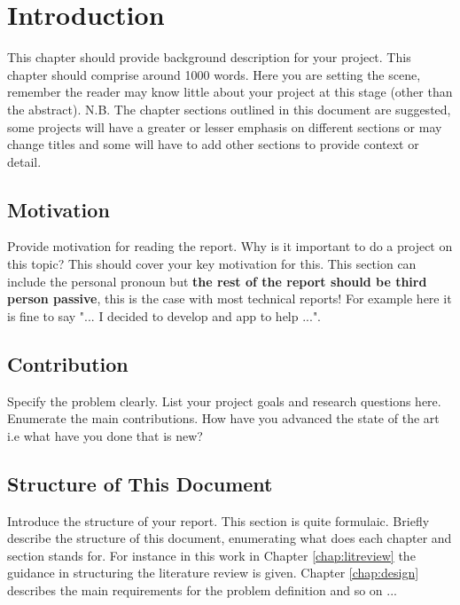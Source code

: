 \chapter{Introduction}
\label{chap:intro}

This chapter should provide background description for your project. This chapter should comprise around 1000 words. Here you are setting the scene, remember the reader may know little about your project at this stage (other than the abstract). N.B. The chapter sections outlined in this document are suggested, some projects will have a greater or lesser emphasis on different sections or may change titles and some will have to add other sections to provide context or detail.

\section{Motivation}
Provide motivation for reading the report. Why is it important to do a project on this topic? This should cover your key motivation for this. This section can include the personal pronoun but \textbf{the rest of the report should be third person passive}, this is the case with most technical reports! For example here it is fine to say "... I decided to develop and app to help ...".

\section{Contribution}
Specify the problem clearly. List your project goals and research questions here. Enumerate the main contributions. How have you advanced the state of the art i.e what have you done that is new?

\section{Structure of This Document}
Introduce the structure of your report. This section is quite formulaic. Briefly describe the structure of this document, enumerating what does each chapter and section stands for. For instance in this work in Chapter \ref{chap:litreview} the guidance in structuring the literature review is given. Chapter \ref{chap:design} describes the main requirements for the problem definition and so on ...